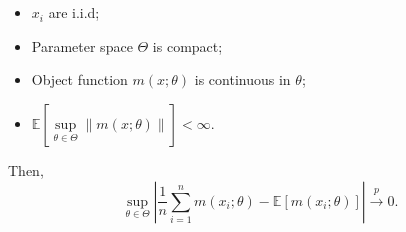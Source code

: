 \begin{proposition}
    \

    \begin{assumption}
        \
        
        \begin{itemize}
            \item $x_i$ are i.i.d;
            \item Parameter space $\Theta$ is compact;
            \item Object function $m(x; \theta)$ is continuous in $\theta$;
            \item $\mathbb{E}\left[\underset{\theta \in \Theta}{\sup} \left\| m(x; \theta) \right\| \right] < \infty$.
        \end{itemize}
    \end{assumption}
    Then,
    \[
    \underset{\theta \in \Theta}{\sup} \left|\frac{1}{n} \sum_{i=1}^{n} m(x_i; \theta) - \mathbb{E}[m(x_i; \theta)] \right| \overset{p}{\rightarrow} 0.
    \]
\end{proposition}

